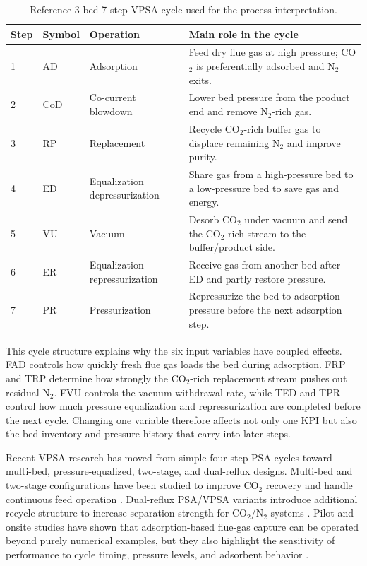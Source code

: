 \documentclass[a4paper,12pt]{article}
\begin{document}
\begin{table}[H]
\centering
\small
\caption{Reference 3-bed 7-step VPSA cycle used for the process interpretation.}
\label{tab:vpsa-cycle}
\begin{tabular}{@{}llp{}p{}@{}}
\toprule
Step & Symbol & Operation & Main role in the cycle \\
\midrule
1 & AD & Adsorption & Feed dry flue gas at high pressure; CO$_2$ is preferentially adsorbed and N$_2$ exits. \\
2 & CoD & Co-current blowdown & Lower bed pressure from the product end and remove N$_2$-rich gas. \\
3 & RP & Replacement & Recycle CO$_2$-rich buffer gas to displace remaining N$_2$ and improve purity. \\
4 & ED & Equalization depressurization & Share gas from a high-pressure bed to a low-pressure bed to save gas and energy. \\
5 & VU & Vacuum & Desorb CO$_2$ under vacuum and send the CO$_2$-rich stream to the buffer/product side. \\
6 & ER & Equalization repressurization & Receive gas from another bed after ED and partly restore pressure. \\
7 & PR & Pressurization & Repressurize the bed to adsorption pressure before the next adsorption step. \\
\bottomrule
\end{tabular}
\end{table}

This cycle structure explains why the six input variables have coupled effects. FAD controls how quickly fresh flue gas loads the bed during adsorption. FRP and TRP determine how strongly the CO$_2$-rich replacement stream pushes out residual N$_2$. FVU controls the vacuum withdrawal rate, while TED and TPR control how much pressure equalization and repressurization are completed before the next cycle. Changing one variable therefore affects not only one KPI but also the bed inventory and pressure history that carry into later steps.

Recent VPSA research has moved from simple four-step PSA cycles toward multi-bed, pressure-equalized, two-stage, and dual-reflux designs. Multi-bed and two-stage configurations have been studied to improve CO$_2$ recovery and handle continuous feed operation \cite{liu2011multibed,shen2012twostage}. Dual-reflux PSA/VPSA variants introduce additional recycle structure to increase separation strength for CO$_2$/N$_2$ systems \cite{li2016dualreflux,shen2017dualreflux}. Pilot and onsite studies have shown that adsorption-based flue-gas capture can be operated beyond purely numerical examples, but they also highlight the sensitivity of performance to cycle timing, pressure levels, and adsorbent behavior \cite{krishnamurthy2014pilot,liu2012onsite,wang2013pilotvpsa}.
\end{document}
